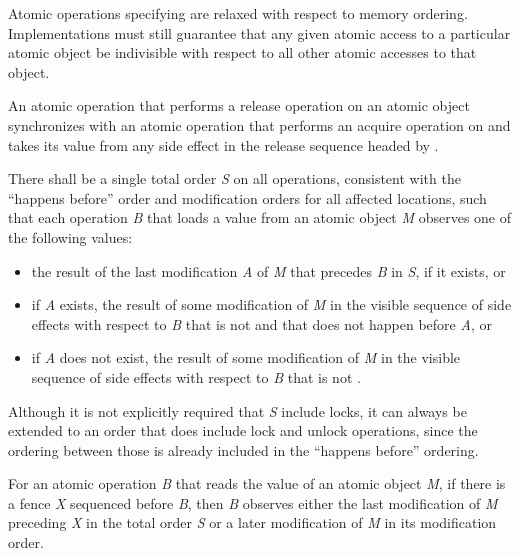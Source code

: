 \enternote Atomic operations specifying  are relaxed
with respect to memory ordering. Implementations must still guarantee that any
given atomic access to a particular atomic object be indivisible with respect
to all other atomic accesses to that object. \exitnote

\pnum
An atomic operation  that performs a release operation on an atomic
object  synchronizes with an atomic operation  that performs
an acquire operation on  and takes its value from any side effect in the
release sequence headed by .

\pnum
There shall be a single total order \textit{S} on all 
operations, consistent with the ``happens before'' order and modification orders for all
affected locations, such that each  operation
\textit{B} that loads a
value from an atomic object \textit{M}
observes one of the following values:

\begin{itemize}
\item the result of the last modification \textit{A} of \textit{M} that precedes
\textit{B} in \textit{S}, if it exists, or

\item if \textit{A} exists, the result of some modification of \textit{M} in the
visible sequence of side effects with respect to \textit{B} that is not
 and that does not happen before \textit{A}, or

\item if \textit{A} does not exist, the result of some modification of \textit{M}
in the visible sequence of side effects with respect to \textit{B} that is not
.
\end{itemize}

\enternote Although it is not explicitly required that \textit{S} include locks, it can
always be extended to an order that does include lock and unlock operations, since the
ordering between those is already included in the ``happens before'' ordering. \exitnote

\pnum
For an atomic operation \textit{B} that reads the value of an atomic object \textit{M},
if there is a  fence \textit{X} sequenced before \textit{B},
then \textit{B} observes either the last  modification of
\textit{M} preceding \textit{X} in the total order \textit{S} or a later modification of
\textit{M} in its modification order.

